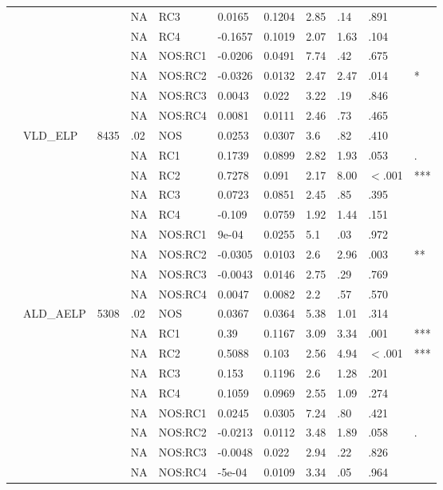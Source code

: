 \begin{table}[ht]
\begin{tabular}{lllllllllll}
   &  &  & NA & RC3 & 0.0165 & 0.1204 & 2.85 & .14 & .891 &   \\ 
   &  &  & NA & RC4 & -0.1657 & 0.1019 & 2.07 & 1.63 & .104 &   \\ 
   &  &  & NA & NOS:RC1 & -0.0206 & 0.0491 & 7.74 & .42 & .675 &   \\ 
   &  &  & NA & NOS:RC2 & -0.0326 & 0.0132 & 2.47 & 2.47 & .014 & * \\ 
   &  &  & NA & NOS:RC3 & 0.0043 & 0.022 & 3.22 & .19 & .846 &   \\ 
   &  &  & NA & NOS:RC4 & 0.0081 & 0.0111 & 2.46 & .73 & .465 &   \\ 
   & VLD\_ELP & 8435 & .02 & NOS & 0.0253 & 0.0307 & 3.6 & .82 & .410 &   \\ 
   &  &  & NA & RC1 & 0.1739 & 0.0899 & 2.82 & 1.93 & .053 & . \\ 
   &  &  & NA & RC2 & 0.7278 & 0.091 & 2.17 & 8.00 & $<$.001 & *** \\ 
   &  &  & NA & RC3 & 0.0723 & 0.0851 & 2.45 & .85 & .395 &   \\ 
   &  &  & NA & RC4 & -0.109 & 0.0759 & 1.92 & 1.44 & .151 &   \\ 
   &  &  & NA & NOS:RC1 & 9e-04 & 0.0255 & 5.1 & .03 & .972 &   \\ 
   &  &  & NA & NOS:RC2 & -0.0305 & 0.0103 & 2.6 & 2.96 & .003 & ** \\ 
   &  &  & NA & NOS:RC3 & -0.0043 & 0.0146 & 2.75 & .29 & .769 &   \\ 
   &  &  & NA & NOS:RC4 & 0.0047 & 0.0082 & 2.2 & .57 & .570 &   \\ 
   & ALD\_AELP & 5308 & .02 & NOS & 0.0367 & 0.0364 & 5.38 & 1.01 & .314 &   \\ 
   &  &  & NA & RC1 & 0.39 & 0.1167 & 3.09 & 3.34 & .001 & *** \\ 
   &  &  & NA & RC2 & 0.5088 & 0.103 & 2.56 & 4.94 & $<$.001 & *** \\ 
   &  &  & NA & RC3 & 0.153 & 0.1196 & 2.6 & 1.28 & .201 &   \\ 
   &  &  & NA & RC4 & 0.1059 & 0.0969 & 2.55 & 1.09 & .274 &   \\ 
   &  &  & NA & NOS:RC1 & 0.0245 & 0.0305 & 7.24 & .80 & .421 &   \\ 
   &  &  & NA & NOS:RC2 & -0.0213 & 0.0112 & 3.48 & 1.89 & .058 & . \\ 
   &  &  & NA & NOS:RC3 & -0.0048 & 0.022 & 2.94 & .22 & .826 &   \\ 
   &  &  & NA & NOS:RC4 & -5e-04 & 0.0109 & 3.34 & .05 & .964 &   \\ 

\end{tabular}
\end{table}

